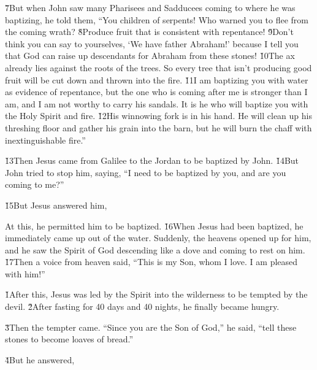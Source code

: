 \v{7}But when John saw many Pharisees and Sadducees coming to where he was baptizing, he told them, ``You children of serpents! Who warned you to flee from the coming wrath? \v{8}Produce fruit that is consistent with repentance! \v{9}Don't think you can say to yourselves, `We have father Abraham!' because I tell you that God can raise up descendants for Abraham from these stones! \v{10}The ax already lies against the roots of the trees. So every tree that isn't producing good fruit will be cut down and thrown into the fire. \v{11}I am baptizing you with water as evidence of repentance, but the one who is coming after me is stronger than I am, and I am not worthy to carry his sandals. It is he who will baptize you with the Holy Spirit and fire. \v{12}His winnowing fork is in his hand. He will clean up his threshing floor and gather his grain into the barn, but he will burn the chaff with inextinguishable fire.''

\v{13}Then Jesus came from Galilee to the Jordan to be baptized by John. \v{14}But John tried to stop him, saying, ``I need to be baptized by you, and are you coming to me?''

\v{15}But Jesus answered him, 

At this, he permitted him to be baptized. \v{16}When Jesus had been baptized, he immediately came up out of the water. Suddenly, the heavens opened up for him, and he saw the Spirit of God descending like a dove and coming to rest on him. \v{17}Then a voice from heaven said, ``This is my Son, whom I love. I am pleased with him!''

\v{1}After this, Jesus was led by the Spirit into the wilderness to be tempted by the devil. \v{2}After fasting for 40 days and 40 nights, he finally became hungry.

\v{3}Then the tempter came. ``Since you are the Son of God,'' he said, ``tell these stones to become loaves of bread.''

\v{4}But he answered, 

\begin{poetry}
\poeml {} \\
\poemll    {} \\
\poemlll       {}
\end{poetry}

